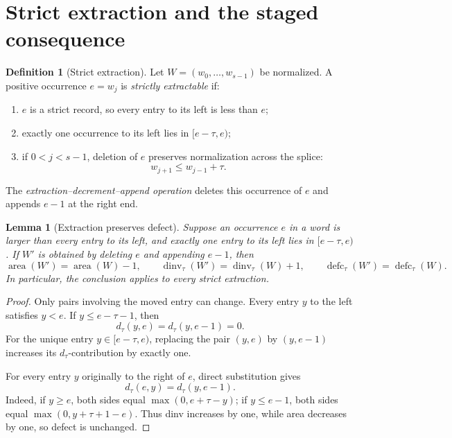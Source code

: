 \documentclass[11pt]{article}
\newtheorem{lemma}[theorem]{Lemma}
\theoremstyle{definition}
\newtheorem{definition}[theorem]{Definition}
\theoremstyle{remark}
\newcommand{\area}{\operatorname{area}}
\newcommand{\dinv}{\operatorname{dinv}}
\newcommand{\defc}{\operatorname{defc}}
\begin{document}
\section{Strict extraction and the staged consequence}

\begin{definition}[Strict extraction]
Let \(W=(w_0,\ldots,w_{s-1})\) be normalized.  A positive occurrence
\(e=w_j\) is \emph{strictly extractable} if:
\begin{enumerate}[label=\textup{(\roman*)}]
  \item \(e\) is a strict record, so every entry to its left is less than
  \(e\);
  \item exactly one occurrence to its left lies in \([e-\tau,e)\);
  \item if \(0<j<s-1\), deletion of \(e\) preserves normalization across
  the splice:
  \[
    w_{j+1}\le w_{j-1}+\tau.
  \]
\end{enumerate}
The \emph{extraction--decrement--append operation} deletes this occurrence
of \(e\) and appends \(e-1\) at the right end.
\end{definition}

\begin{lemma}[Extraction preserves defect]
\label{lem:extraction}
Suppose an occurrence \(e\) in a word is larger than every entry to its
left, and exactly one entry to its left lies in \([e-\tau,e)\).  If
\(W'\) is obtained by deleting \(e\) and appending \(e-1\), then
\[
  \area(W')=\area(W)-1,
  \qquad
  \dinv_\tau(W')=\dinv_\tau(W)+1,
  \qquad
  \defc_\tau(W')=\defc_\tau(W).
\]
In particular, the conclusion applies to every strict extraction.
\end{lemma}

\begin{proof}
Only pairs involving the moved entry can change.  Every entry \(y\) to the
left satisfies \(y<e\).  If \(y\le e-\tau-1\), then
\[
  d_\tau(y,e)=d_\tau(y,e-1)=0.
\]
For the unique entry \(y\in[e-\tau,e)\), replacing the pair
\((y,e)\) by \((y,e-1)\) increases its \(d_\tau\)-contribution by
exactly one.

For every entry \(y\) originally to the right of \(e\), direct
substitution gives
\[
  d_\tau(e,y)=d_\tau(y,e-1).
\]
Indeed, if \(y\ge e\), both sides equal
\(\max(0,e+\tau-y)\); if \(y\le e-1\), both sides equal
\(\max(0,y+\tau+1-e)\).  Thus dinv increases by one, while area
decreases by one, so defect is unchanged.
\end{proof}
\end{document}
